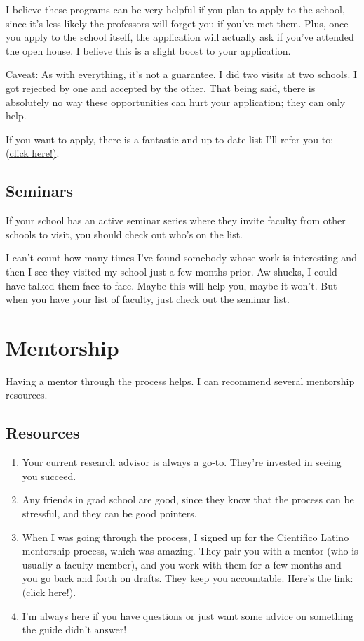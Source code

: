 \documentclass[12pt]{article}
\begin{document}
I believe these programs can be very helpful if you plan to apply to the school, since it's less likely the professors will forget you if you've met them. Plus, once you apply to the school itself, the application will actually ask if you've attended the open house. I believe this is a slight boost to your application.

Caveat: As with everything, it's not a guarantee. I did two visits at two schools. I got rejected by one and accepted by the other. That being said, there is absolutely no way these opportunities can hurt your application; they can only help.

If you want to apply, there is a fantastic and up-to-date list I'll refer you to: \href{https://www.cientificolatino.com/diversity-preview-events}{(click here!)}.

\subsection{Seminars}
If your school has an active seminar series where they invite faculty from other schools to visit, you should check out who's on the list. 

I can't count how many times I've found somebody whose work is interesting and then I see they visited my school just a few months prior. Aw shucks, I could have talked them face-to-face. Maybe this will help you, maybe it won't. But when you have your list of faculty, just check out the seminar list.

\section{Mentorship}
Having a mentor through the process helps. I can recommend several mentorship resources.
\subsection{Resources}
\begin{enumerate}
\item Your current research advisor is always a go-to. They're invested in seeing you succeed.

\item Any friends in grad school are good, since they know that the process can be stressful, and they can be good pointers.

\item When I was going through the process, I signed up for the Cientifico Latino mentorship process, which was amazing. They pair you with a mentor (who is usually a faculty member), and you work with them for a few months and you go back and forth on drafts. They keep you accountable. Here's the link: \href{https://www.cientificolatino.com/gsmi}{(click here!)}.

\item I'm always here if you have questions or just want some advice on something the guide didn't answer!
\end{enumerate}
\newpage
\end{document}
